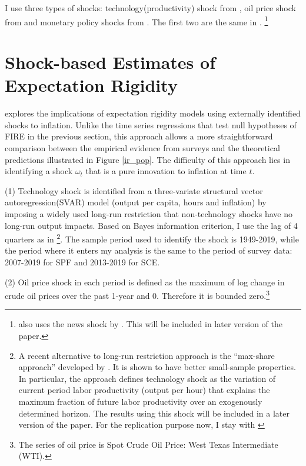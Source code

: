 \documentclass[12pt]{article}
\begin{document}
	I use three types of shocks: technology(productivity) shock from \citet{gali1999technology}, oil price shock from \citet{hamilton1996happened} and monetary policy shocks from  \citet{laseen2011anticipated}. The first two are the same in \citet{coibion2012can}. \footnote{ \citet{coibion2012can} also uses the news shock by \citet{barsky2011news}. This will be included in later version of the paper.} 
	
	
	\section{Shock-based Estimates of Expectation Rigidity }\label{ShockBased}
	
	\citet{coibion2012can} explores the implications of expectation rigidity models using externally identified shocks to inflation.  Unlike the time series regressions that test null hypotheses of FIRE in the previous section, this approach allows a more straightforward comparison between the empirical evidence from surveys and the theoretical predictions illustrated in Figure \ref{ir_pop}. The difficulty of this approach lies in identifying a shock $\omega_t$ that is a pure innovation to inflation at time $t$. 
	
	(1) Technology shock is identified from a three-variate structural vector autoregression(SVAR) model  (output per capita, hours and inflation) by imposing a widely used long-run restriction that non-technology shocks have no long-run output impacts. Based on Bayes information criterion, I use the lag of 4 quarters as in \citet{coibion2012can} \footnote{A recent alternative to long-run restriction approach is the ``max-share approach'' developed by \citet{francis2014flexible}. It is shown to have better small-sample properties. In particular,  the approach defines technology shock as the variation of current period labor productivity (output per hour) that explains the maximum fraction of future labor productivity over an exogenously determined horizon. The results using this shock will be included in a later version of the paper. For the replication purpose now, I stay with \citet{gali1999technology}}. The sample period used to identify the shock is 1949-2019, while the period where it enters my analysis is the same to the period of survey data: 2007-2019 for SPF and 2013-2019 for SCE. 
	
	(2) Oil price shock in each period is defined as the maximum of log change in crude oil prices over the past 1-year and 0. Therefore it is bounded zero.\footnote{The series of oil price is Spot Crude Oil Price: West Texas Intermediate (WTI).}
	
\end{document}
